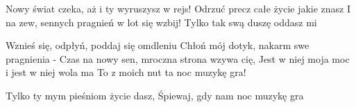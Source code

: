 \documentclass[../../../songbook.tex]{subfiles}
\begin{document}
\-\hspace{0.5cm} Nowy świat czeka, aż i ty wyruszysz w rejs!		 \newline
\-\hspace{0.5cm} Odrzuć precz całe życie jakie znasz					 \newline
\-\hspace{0.5cm} I na zew, sennych pragnień w lot się wzbij!						 \newline
\-\hspace{0.5cm} Tylko tak swą duszę oddasz mi							 \newline

Wznieś się, odpłyń, poddaj się omdleniu				\newline
Chłoń mój dotyk, nakarm swe pragnienia -			\newline
Czas na nowy sen, mroczna strona wzywa cię,	\newline
Jest w niej moja moc i jest w niej wola ma		 		\newline
To z moich nut ta noc muzykę gra!				 \newline

\-\hspace{0.5cm} Tylko ty mym pieśniom życie dasz,		 \newline
\-\hspace{0.5cm} Śpiewaj, gdy nam noc muzykę gra			 \newline
\end{document}
